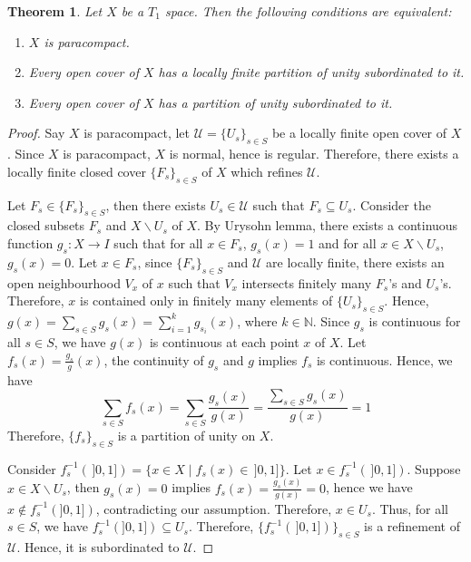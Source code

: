\documentclass[12pt,oneside,english]{amsbook}
\numberwithin{equation}{section} %
\numberwithin{figure}{section} %
\theoremstyle{plain}
\numberwithin{section}{chapter}
\newtheorem{thm}{Theorem}[section]
\theoremstyle{plain}
\begin{document}
\begin{thm} \label{thm:paracompact:7}
  Let $X$ be a $T_{1}$ space. Then the following conditions are equivalent:
  \begin{enumerate}
  \item $X$ is paracompact.
  \item Every open cover of $X$ has a locally finite partition of unity subordinated to it.
  \item Every open cover of $X$ has a partition of unity subordinated to it.
  \end{enumerate}
\end{thm}
\begin{proof}

  Say $X$ is paracompact, let $\mathcal{U} = \{U_{s}\}_{s \in S}$ be a locally finite open cover of $X$. Since $X$ is paracompact, $X$ is normal, hence is regular. Therefore, there exists a locally finite closed cover $\{F_{s}\}_{s \in S}$ of $X$ which refines $\mathcal{U}$.

  Let $F_{s} \in \{F_{s}\}_{s \in S}$, then there exists $U_{s} \in \mathcal{U}$ such that $F_{s} \subseteq U_{s}$. Consider the closed subsets $F_{s}$ and $X \backslash U_{s}$ of $X$. By Urysohn lemma, there exists a continuous function $g_{s}:X \to I$ such that for all $x \in F_{s}$, $g_{s}(x) = 1$ and for all $x \in X \backslash U_{s}$, $g_{s}(x) = 0$. Let $x \in F_{s}$, since $\{F_{s}\}_{s \in S}$ and $\mathcal{U}$ are locally finite, there exists an open neighbourhood $V_{x}$ of $x$ such that $V_{x}$ intersects finitely many $F_{s}$'s and $U_s$'s. Therefore, $x$ is contained only in finitely many elements of $\{U_{s}\}_{s \in S}$. Hence, $g(x) = \sum_{s \in S} g_{s}(x) = \sum_{i = 1}^{k}g_{s_{i}}(x)$, where $k \in \mathbb{N}$. Since $g_{s}$ is continuous for all $s \in S$, we have $g(x)$ is continuous at each point $x$ of $X$. Let $f_{s}(x) = \frac{g_{s}}{g}(x)$, the continuity of $g_{s}$ and $g$ implies $f_{s}$ is continuous. Hence, we have
  $$\sum_{s \in S}f_{s}(x) = \sum_{s \in S}\frac{g_{s}(x)}{g(x)} = \frac{\sum_{s \in S}g_{s}(x)}{g(x)} = 1$$
  Therefore, $\{f_{s}\}_{s \in S}$ is a partition of unity on $X$.

  Consider $f_{s}^{-1}(\,]0, 1]) = \{x \in X \; | \; f_{s}(x) \in \, ]0, 1] \}$. Let $x \in f_{s}^{-1}(\,]0, 1])$. Suppose $x \in X \backslash U_{s}$, then $g_{s}(x) = 0$ implies $f_{s}(x) = \frac{g_{s}(x)}{g(x)} = 0$, hence we have $x \notin f_{s}^{-1}(]0, 1])$, contradicting our assumption. Therefore, $x \in U_{s}$.  Thus, for all $s \in S$, we have $f_{s}^{-1}(]0,1]) \subseteq U_{s}$. Therefore, $\{f_{s}^{-1}(\,]0,1])\}_{s \in S}$ is a refinement of $\mathcal{U}$. Hence, it is subordinated to $\mathcal{U}$.


\end{proof}
\end{document}
